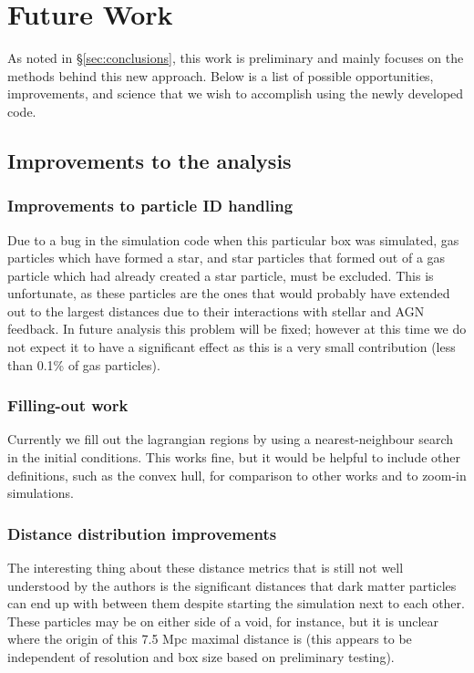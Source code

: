 \section{Future Work}
\label{sec:futurework}

As noted in \S \ref{sec:conclusions}, this work is preliminary and mainly
focuses on the methods behind this new approach. Below is a list of possible
opportunities, improvements, and science that we wish to accomplish using the
newly developed \ltcaesar{} code.

\subsection{Improvements to the analysis}

\subsubsection{Improvements to particle ID handling}

Due to a bug in the simulation code when this particular box was simulated,
gas particles which have formed a star, and star particles that formed out of
a gas particle which had already created a star particle, must be excluded.
This is unfortunate, as these particles are the ones that would probably have
extended out to the largest distances due to their interactions with stellar
and AGN feedback. In future analysis this problem will be fixed; however at
this time we do not expect it to have a significant effect as this is a very
small contribution (less than 0.1\% of gas particles).

\subsubsection{Filling-out work}

Currently we fill out the lagrangian regions by using a nearest-neighbour
search in the initial conditions. This works fine, but it would be helpful
to include other definitions, such as the convex hull, for comparison to 
other works and to zoom-in simulations.

\subsubsection{Distance distribution improvements}

The interesting thing about these distance metrics that is still not 
well understood by the authors is the significant distances that dark matter
particles can end up with between them despite starting the simulation
next to each other. These particles may be on either side of a void,
for instance, but it is unclear where the origin of this 7.5 Mpc maximal
distance is (this appears to be independent of resolution and box size
based on preliminary testing).

